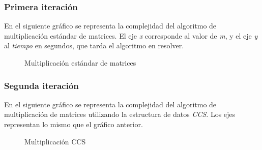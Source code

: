 \documentclass[a4paper,11pt]{article}
\begin{document}
\subsubsection{Primera iteraci\'on}
En el siguiente gr\'afico se representa la complejidad del algoritmo de multiplicaci\'on est\'andar de matrices. El eje \emph{x} corresponde al valor de \emph{m}, y el eje \emph{y} al \emph{tiempo} en segundos, que tarda el algoritmo en resolver.
\renewcommand{\figurename}{Figura}
\begin{figure}[H]
	\centerline{
    }
  	\caption{Multiplicaci\'on est\'andar de matrices}
  	\label{fig:normal}
\end{figure}

\subsubsection{Segunda iteraci\'on}
En el siguiente gr\'afico se representa la complejidad del algoritmo de multiplicaci\'on de matrices utilizando la estructura de datos \emph{CCS}. Los ejes representan lo mismo que el gr\'afico anterior.
\begin{figure}[H]
	\centerline{
    }
  	\caption{Multiplicaci\'on CCS}
  	\label{fig:ccs}
\end{figure}
\end{document}
